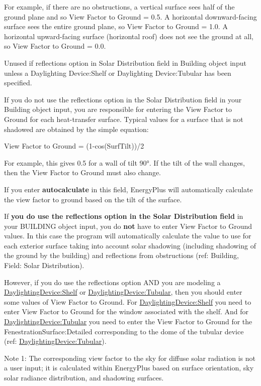 For example, if there are no obstructions, a vertical surface sees half of the ground plane and so View Factor to Ground = 0.5. A horizontal downward-facing surface sees the entire ground plane, so View Factor to Ground = 1.0. A horizontal upward-facing surface (horizontal roof) does not see the ground at all, so View Factor to Ground = 0.0.

Unused if reflections option in Solar Distribution field in Building object input unless a Daylighting Device:Shelf or Daylighting Device:Tubular has been specified.

If you do not use the reflections option in the Solar Distribution field in your Building object input, you are responsible for entering the View Factor to Ground for each heat-transfer surface. Typical values for a surface that is not shadowed are obtained by the simple equation:

View Factor to Ground = (1-cos(SurfTilt))/2

For example, this gives 0.5 for a wall of tilt 90°. If the tilt of the wall changes, then the View Factor to Ground must also change.

If you enter \textbf{autocalculate} in this field, EnergyPlus will automatically calculate the view factor to ground based on the tilt of the surface.

If \textbf{you do use the reflections option in the Solar Distribution field} in your BUILDING object input, you do \textbf{not} have to enter View Factor to Ground values. In this case the program will automatically calculate the value to use for each exterior surface taking into account solar shadowing (including shadowing of the ground by the building) and reflections from obstructions (ref: Building, Field: Solar Distribution).

However, if you do use the reflections option AND you are modeling a \hyperref[daylightingdeviceshelf]{DaylightingDevice:Shelf} or \hyperref[daylightingdevicetubular]{DaylightingDevice:Tubular}, then you should enter some values of View Factor to Ground. For \hyperref[daylightingdeviceshelf]{DaylightingDevice:Shelf} you need to enter View Factor to Ground for the window associated with the shelf. And for \hyperref[daylightingdevicetubular]{DaylightingDevice:Tubular} you need to enter the View Factor to Ground for the FenestrationSurface:Detailed corresponding to the dome of the tubular device (ref: \hyperref[daylightingdevicetubular]{DaylightingDevice:Tubular}).

Note 1: The corresponding view factor to the sky for diffuse solar radiation is not a user input; it is calculated within EnergyPlus based on surface orientation, sky solar radiance distribution, and shadowing surfaces.


